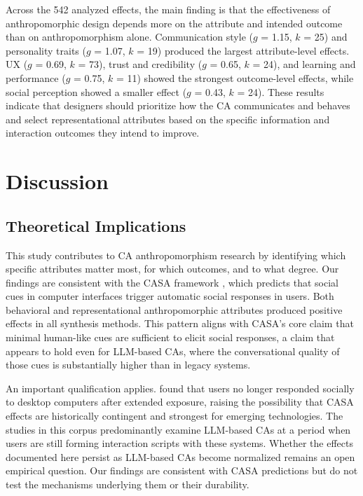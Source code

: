 \documentclass[preprint,review,12pt,authoryear,nonatbib]{elsarticle}
\begin{document}
Across the 542 analyzed effects, the main finding is that the effectiveness of anthropomorphic design depends more on the attribute and intended outcome than on anthropomorphism alone. Communication style ($g$ = 1.15, $k$ = 25) and personality traits ($g$ = 1.07, $k$ = 19) produced the largest attribute-level effects. UX ($g$ = 0.69, $k$ = 73), trust and credibility ($g$ = 0.65, $k$ = 24), and learning and performance ($g$ = 0.75, $k$ = 11) showed the strongest outcome-level effects, while social perception showed a smaller effect ($g$ = 0.43, $k$ = 24). These results indicate that designers should prioritize how the CA communicates and behaves and select representational attributes based on the specific information and interaction outcomes they intend to improve.

\section{Discussion}

\subsection{Theoretical Implications}

This study contributes to CA anthropomorphism research by identifying which specific attributes matter most, for which outcomes, and to what degree. Our findings are consistent with the CASA framework \parencite{nass1994computers}, which predicts that social cues in computer interfaces trigger automatic social responses in users. Both behavioral and representational anthropomorphic attributes produced positive effects in all synthesis methods. This pattern aligns with CASA's core claim that minimal human-like cues are sufficient to elicit social responses, a claim that appears to hold even for LLM-based CAs, where the conversational quality of those cues is substantially higher than in legacy systems.

An important qualification applies. \textcite{koger2023casa} found that users no longer responded socially to desktop computers after extended exposure, raising the possibility that CASA effects are historically contingent and strongest for emerging technologies. The studies in this corpus predominantly examine LLM-based CAs at a period when users are still forming interaction scripts with these systems. Whether the effects documented here persist as LLM-based CAs become normalized remains an open empirical question. Our findings are consistent with CASA predictions but do not test the mechanisms underlying them or their durability.
\end{document}
